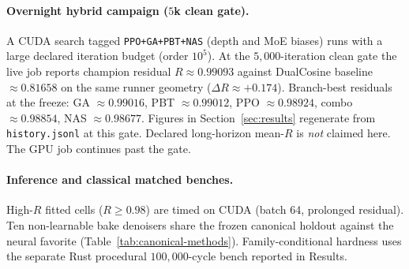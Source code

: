 \paragraph{Overnight hybrid campaign ($5$k clean gate).}
A CUDA search tagged \texttt{PPO+GA+PBT+NAS} (depth and MoE biases) runs with a large declared iteration budget (order $10^{5}$).
At the $5{,}000$-iteration clean gate the live job reports champion residual $R\approx 0.99093$ against DualCosine baseline $\approx 0.81658$ on the same runner geometry ($\Delta R\approx{+}0.174$).
Branch-best residuals at the freeze: GA $\approx 0.99016$, PBT $\approx 0.99012$, PPO $\approx 0.98924$, combo $\approx 0.98854$, NAS $\approx 0.98677$.
Figures in Section~\ref{sec:results} regenerate from \texttt{history.jsonl} at this gate.
Declared long-horizon mean-$R$ is \emph{not} claimed here. The GPU job continues past the gate.

\paragraph{Inference and classical matched benches.}
High-$R$ fitted cells ($R\ge 0.98$) are timed on CUDA (batch 64, prolonged residual).
Ten non-learnable bake denoisers share the frozen canonical holdout against the neural favorite (Table~\ref{tab:canonical-methods}).
Family-conditional hardness uses the separate Rust procedural $100{,}000$-cycle bench reported in Results.
